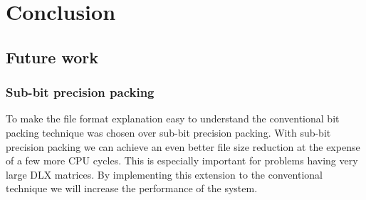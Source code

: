 
\chapter{Conclusion}
\label{conclusion}


\section{Future work}

\subsection{Sub-bit precision packing}

To make the file format explanation easy to understand the conventional bit packing technique was chosen over sub-bit precision packing.
With sub-bit precision packing we can achieve an even better file size reduction at the expense of a few more CPU cycles.
This is especially important for problems having very large DLX matrices.
By implementing this extension to the conventional technique we will increase the performance of the system.

